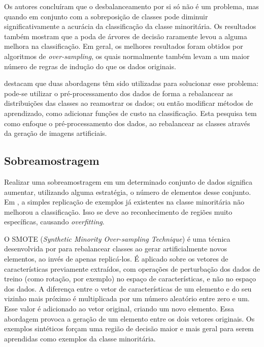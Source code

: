 Os autores concluíram que o desbalanceamento por si só não é um problema, mas quando em conjunto com a sobreposição de classes pode diminuir significativamente a acurácia da classificação da classe minoritária. Os resultados também mostram que a poda de árvores de decisão raramente levou a alguma melhora na classificação. Em geral, os melhores resultados foram obtidos por algoritmos de \textit{over-sampling}, os quais normalmente também levam a um maior número de regras de indução do que os dados originais.


 destacam que duas abordagens têm sido utilizadas para solucionar esse problema: pode-se utilizar o pré-processamento dos dados de forma a rebalancear as distribuições das classes ao reamostrar os dados; ou então modificar métodos de aprendizado, como adicionar funções de custo na classificação. Esta pesquisa tem como enfoque o pré-processamento dos dados, ao rebalancear as classes através da geração de imagens artificiais.

\subsection{Sobreamostragem}

Realizar uma sobreamostragem em um determinado conjunto de dados significa aumentar, utilizando alguma estratégia, o número de elementos desse conjunto. Em , a simples replicação de exemplos já existentes na classe minoritária não melhorou a classificação. Isso se deve ao reconhecimento de regiões muito específicas, causando \textit{overfitting}.

O SMOTE (\textit{Synthetic Minority Over-sampling Technique}) é uma técnica desenvolvida por  para rebalancear classes ao gerar artificialmente novos elementos, ao invés de apenas replicá-los. É aplicado sobre os vetores de características previamente extraídos, com operações de perturbação dos dados de treino (como rotação, por exemplo) no espaço de características, e não no espaço dos dados. A diferença entre o vetor de características de um elemento e do seu vizinho mais próximo é multiplicada por um número aleatório entre zero e um. Esse valor é adicionado ao vetor original, criando um novo elemento. Essa abordagem provoca a geração de um elemento entre os dois vetores originais. Os exemplos sintéticos forçam uma região de decisão maior e mais geral para serem aprendidas como exemplos da classe minoritária.

